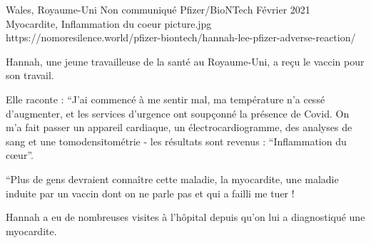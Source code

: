 {Wales, Royaume-Uni}
{Non communiqué}
{Pfizer/BioNTech}
{Février 2021}
{Myocardite, Inflammation du coeur}
{picture.jpg}
{https://nomoresilence.world/pfizer-biontech/hannah-lee-pfizer-adverse-reaction/}
{

Hannah, une jeune travailleuse de la santé au Royaume-Uni, a reçu le vaccin pour
son travail.

Elle raconte : “J'ai commencé à me sentir mal, ma température n'a cessé
d'augmenter, et les services d'urgence ont soupçonné la présence de Covid. On
m'a fait passer un appareil cardiaque, un électrocardiogramme, des analyses de
sang et une tomodensitométrie - les résultats sont revenus : “Inflammation du
cœur”.

“Plus de gens devraient connaître cette maladie, la myocardite, une maladie
induite par un vaccin dont on ne parle pas et qui a failli me tuer !

Hannah a eu de nombreuses visites à l'hôpital depuis qu'on lui a diagnostiqué
une myocardite.

}
